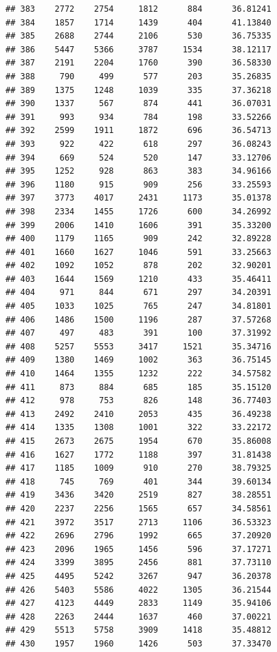 \documentclass[
]{article}
\begin{document}
\begin{verbatim}
## 383    2772    2754     1812      884      36.81241
## 384    1857    1714     1439      404      41.13840
## 385    2688    2744     2106      530      36.75335
## 386    5447    5366     3787     1534      38.12117
## 387    2191    2204     1760      390      36.58330
## 388     790     499      577      203      35.26835
## 389    1375    1248     1039      335      37.36218
## 390    1337     567      874      441      36.07031
## 391     993     934      784      198      33.52266
## 392    2599    1911     1872      696      36.54713
## 393     922     422      618      297      36.08243
## 394     669     524      520      147      33.12706
## 395    1252     928      863      383      34.96166
## 396    1180     915      909      256      33.25593
## 397    3773    4017     2431     1173      35.01378
## 398    2334    1455     1726      600      34.26992
## 399    2006    1410     1606      391      35.33200
## 400    1179    1165      909      242      32.89228
## 401    1660    1627     1046      591      33.25663
## 402    1092    1052      878      202      32.90201
## 403    1644    1569     1210      433      35.46411
## 404     971     844      671      297      34.20391
## 405    1033    1025      765      247      34.81801
## 406    1486    1500     1196      287      37.57268
## 407     497     483      391      100      37.31992
## 408    5257    5553     3417     1521      35.34716
## 409    1380    1469     1002      363      36.75145
## 410    1464    1355     1232      222      34.57582
## 411     873     884      685      185      35.15120
## 412     978     753      826      148      36.77403
## 413    2492    2410     2053      435      36.49238
## 414    1335    1308     1001      322      33.22172
## 415    2673    2675     1954      670      35.86008
## 416    1627    1772     1188      397      31.81438
## 417    1185    1009      910      270      38.79325
## 418     745     769      401      344      39.60134
## 419    3436    3420     2519      827      38.28551
## 420    2237    2256     1565      657      34.58561
## 421    3972    3517     2713     1106      36.53323
## 422    2696    2796     1992      665      37.20920
## 423    2096    1965     1456      596      37.17271
## 424    3399    3895     2456      881      37.73110
## 425    4495    5242     3267      947      36.20378
## 426    5403    5586     4022     1305      36.21544
## 427    4123    4449     2833     1149      35.94106
## 428    2263    2444     1637      460      37.00221
## 429    5513    5758     3909     1418      35.48812
## 430    1957    1960     1426      503      37.33470

\end{verbatim}
\end{document}
